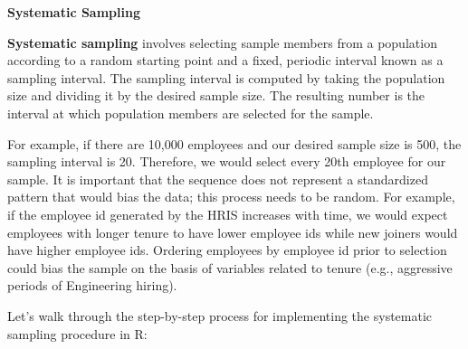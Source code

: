 \documentclass[]{book}
\newenvironment{Shaded}{\begin{snugshade}}{\end{snugshade}}
\newcommand{\CommentTok}[1]{\textcolor[rgb]{0.56,0.35,0.01}{\textit{#1}}}
\newcommand{\DataTypeTok}[1]{\textcolor[rgb]{0.13,0.29,0.53}{#1}}
\newcommand{\DecValTok}[1]{\textcolor[rgb]{0.00,0.00,0.81}{#1}}
\newcommand{\KeywordTok}[1]{\textcolor[rgb]{0.13,0.29,0.53}{\textbf{#1}}}
\newcommand{\NormalTok}[1]{#1}
\newcommand{\OperatorTok}[1]{\textcolor[rgb]{0.81,0.36,0.00}{\textbf{#1}}}
\newcommand{\StringTok}[1]{\textcolor[rgb]{0.31,0.60,0.02}{#1}}
\begin{document}
\begin{Shaded}
\end{Shaded}

\textbf{Systematic Sampling}

\textbf{Systematic sampling} involves selecting sample members from a population according to a random starting point and a fixed, periodic interval known as a sampling interval. The sampling interval is computed by taking the population size and dividing it by the desired sample size. The resulting number is the interval at which population members are selected for the sample.

For example, if there are 10,000 employees and our desired sample size is 500, the sampling interval is 20. Therefore, we would select every 20th employee for our sample. It is important that the sequence does not represent a standardized pattern that would bias the data; this process needs to be random. For example, if the employee id generated by the HRIS increases with time, we would expect employees with longer tenure to have lower employee ids while new joiners would have higher employee ids. Ordering employees by employee id prior to selection could bias the sample on the basis of variables related to tenure (e.g., aggressive periods of Engineering hiring).

Let's walk through the step-by-step process for implementing the systematic sampling procedure in R:
\end{document}
